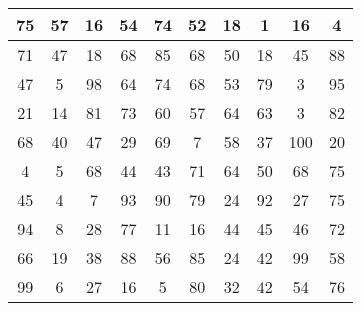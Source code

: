\documentclass[11pt]{article}
\begin{document}
\begin{center}

\begin{tabular}{| c | c | c | c | c | c | c | c | c | c |}
\hline
75 & 57 & 16 & 54 & 74 & 52 & 18 & 1 & 16 & 4\\
\hline

71 & 47 & 18 & 68 & 85 & 68 & 50 & 18 & 45 & 88\\
\hline

47 & 5 & 98 & 64 & 74 & 68 & 53 & 79 & 3 & 95\\
\hline

21 & 14 & 81 & 73 & 60 & 57 & 64 & 63 & 3 & 82\\
\hline

68 & 40 & 47 & 29 & 69 & 7 & 58 & 37 & 100 & 20\\
\hline

4 & 5 & 68 & 44 & 43 & 71 & 64 & 50 & 68 & 75\\
\hline

45 & 4 & 7 & 93 & 90 & 79 & 24 & 92 & 27 & 75\\
\hline

94 & 8 & 28 & 77 & 11 & 16 & 44 & 45 & 46 & 72\\
\hline

66 & 19 & 38 & 88 & 56 & 85 & 24 & 42 & 99 & 58\\
\hline

99 & 6 & 27 & 16 & 5 & 80 & 32 & 42 & 54 & 76\\
\hline

\end{tabular}

\end{center}
\end{document}
